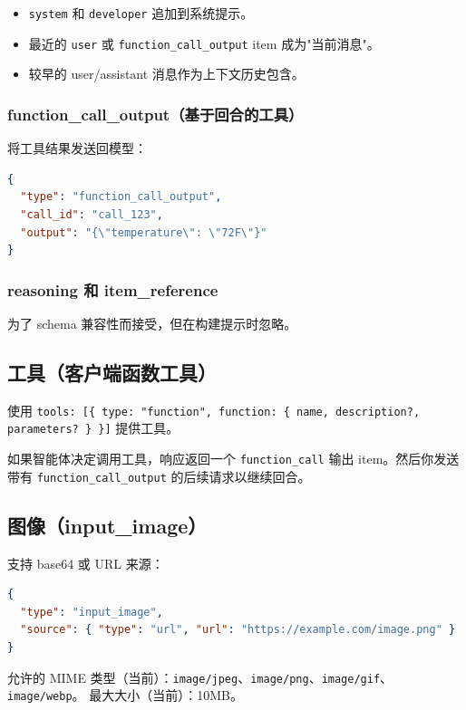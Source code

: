 \begin{itemize}
  \item \texttt{system} 和 \texttt{developer} 追加到系统提示。
  \item 最近的 \texttt{user} 或 \texttt{function\_call\_output} item 成为"当前消息"。
  \item 较早的 user/assistant 消息作为上下文历史包含。
\end{itemize}


\subsubsection{function\_call\_output（基于回合的工具）}


将工具结果发送回模型：

\begin{lstlisting}[language=json]
{
  "type": "function_call_output",
  "call_id": "call_123",
  "output": "{\"temperature\": \"72F\"}"
}
\end{lstlisting}


\subsubsection{reasoning 和 item\_reference}


为了 schema 兼容性而接受，但在构建提示时忽略。

\subsection{工具（客户端函数工具）}


使用 \texttt{tools: [\{ type: "function", function: \{ name, description?, parameters? \} \}]} 提供工具。

如果智能体决定调用工具，响应返回一个 \texttt{function\_call} 输出 item。然后你发送带有 \texttt{function\_call\_output} 的后续请求以继续回合。

\subsection{图像（input\_image）}


支持 base64 或 URL 来源：

\begin{lstlisting}[language=json]
{
  "type": "input_image",
  "source": { "type": "url", "url": "https://example.com/image.png" }
}
\end{lstlisting}


允许的 MIME 类型（当前）：\texttt{image/jpeg}、\texttt{image/png}、\texttt{image/gif}、\texttt{image/webp}。
最大大小（当前）：10MB。

